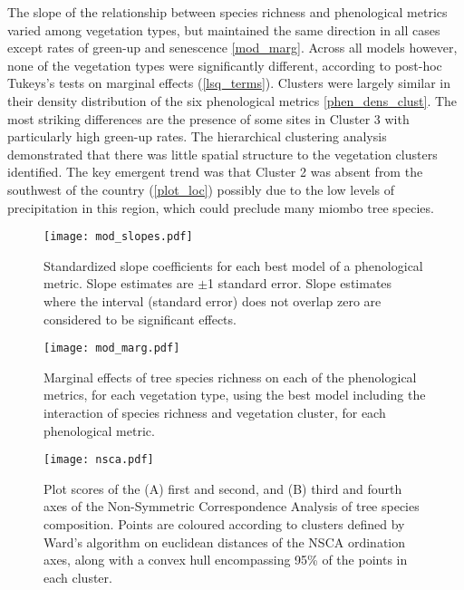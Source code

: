 \documentclass[11pt,a4paper]{article}
\begin{document}
The slope of the relationship between species richness and phenological metrics varied among vegetation types, but maintained the same direction in all cases except rates of green-up and senescence \autoref{mod_marg}. Across all models however, none of the vegetation types were significantly different, according to post-hoc Tukeys's tests on marginal effects (\autoref{lsq_terms}). Clusters were largely similar in their density distribution of the six phenological metrics \autoref{phen_dens_clust}. The most striking differences are the presence of some sites in Cluster 3 with particularly high green-up rates. The hierarchical clustering analysis demonstrated that there was little spatial structure to the vegetation clusters identified. The key emergent trend was that Cluster 2 was absent from the southwest of the country (\autoref{plot_loc}) possibly due to the low levels of precipitation in this region, which could preclude many miombo tree species.



 

\begin{figure}[H]
\centering
	\texttt{[image: mod\_slopes.pdf]}
	\caption{Standardized slope coefficients for each best model of a phenological metric. Slope estimates are $\pm$1 standard error. Slope estimates where the interval (standard error) does not overlap zero are considered to be significant effects.}
	\label{mod_slopes}
\end{figure}

\begin{figure}[H]
\centering
	\texttt{[image: mod\_marg.pdf]}
	\caption{Marginal effects of tree species richness on each of the phenological metrics, for each vegetation type, using the best model including the interaction of species richness and vegetation cluster, for each phenological metric.}
	\label{mod_marg}
\end{figure}

\begin{figure}[H]
\centering
	\texttt{[image: nsca.pdf]}
	\caption{Plot scores of the (A) first and second, and (B) third and fourth axes of the Non-Symmetric Correspondence Analysis of tree species composition. Points are coloured according to clusters defined by Ward's algorithm on euclidean distances of the NSCA ordination axes, along with a convex hull encompassing 95\% of the points in each cluster.}
	\label{nsca}
\end{figure}
\end{document}
